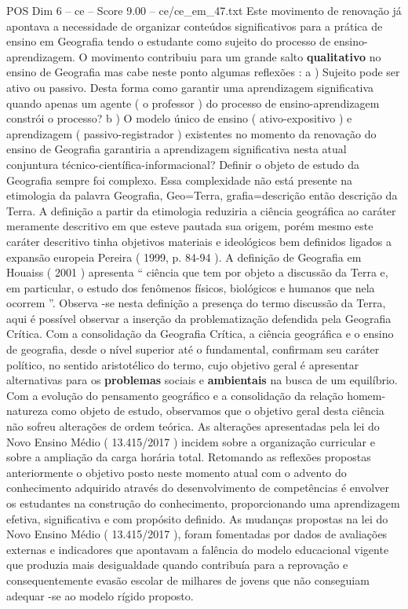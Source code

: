 \begin{textsample}{POS Dim 6 – ce – Score 9.00 – ce/ce\_em\_47.txt}
Este movimento de renovação já apontava a necessidade de organizar conteúdos significativos para a prática de ensino em Geografia tendo o estudante como sujeito do processo de ensino-aprendizagem.
O movimento contribuiu para um grande salto \textbf{qualitativo} no ensino de Geografia mas cabe neste ponto algumas reflexões : a ) Sujeito pode ser ativo ou passivo.
Desta forma como garantir uma aprendizagem significativa quando apenas um agente ( o professor ) do processo de ensino-aprendizagem constrói o processo? b ) O modelo único de ensino ( ativo-expositivo ) e aprendizagem ( passivo-registrador ) existentes no momento da renovação do ensino de Geografia garantiria a aprendizagem significativa nesta atual conjuntura técnico-científica-informacional?
Definir o objeto de estudo da Geografia sempre foi complexo.
Essa complexidade não está presente na etimologia da palavra Geografia, Geo=Terra, grafia=descrição então descrição da Terra.
A definição a partir da etimologia reduziria a ciência geográfica ao caráter meramente descritivo em que esteve pautada sua origem, porém mesmo este caráter descritivo tinha objetivos materiais e ideológicos bem definidos ligados a expansão europeia Pereira ( 1999, p. 84-94 ).
A definição de Geografia em Houaiss ( 2001 ) apresenta “ ciência que tem por objeto a discussão da Terra e, em particular, o estudo dos fenômenos físicos, biológicos e humanos que nela ocorrem ”.
Observa -se nesta definição a presença do termo discussão da Terra, aqui é possível observar a inserção da problematização defendida pela Geografia Crítica.
Com a consolidação da Geografia Crítica, a ciência geográfica e o ensino de geografia, desde o nível superior até o fundamental, confirmam seu caráter político, no sentido aristotélico do termo, cujo objetivo geral é apresentar alternativas para os \textbf{problemas} sociais e \textbf{ambientais} na busca de um equilíbrio.
Com a evolução do pensamento geográfico e a consolidação da relação homem-natureza como objeto de estudo, observamos que o objetivo geral desta ciência não sofreu alterações de ordem teórica.
As alterações apresentadas pela lei do Novo Ensino Médio ( 13.415/2017 ) incidem sobre a organização curricular e sobre a ampliação da carga horária total.
Retomando as reflexões propostas anteriormente o objetivo posto neste momento atual com o advento do conhecimento adquirido através do desenvolvimento de competências é envolver os estudantes na construção do conhecimento, proporcionando uma aprendizagem efetiva, significativa e com propósito definido.
As mudanças propostas na lei do Novo Ensino Médio ( 13.415/2017 ), foram fomentadas por dados de avaliações externas e indicadores que apontavam a falência do modelo educacional vigente que produzia mais desigualdade quando contribuía para a reprovação e consequentemente evasão escolar de milhares de jovens que não conseguiam adequar -se ao modelo rígido proposto.

\end{textsample}
